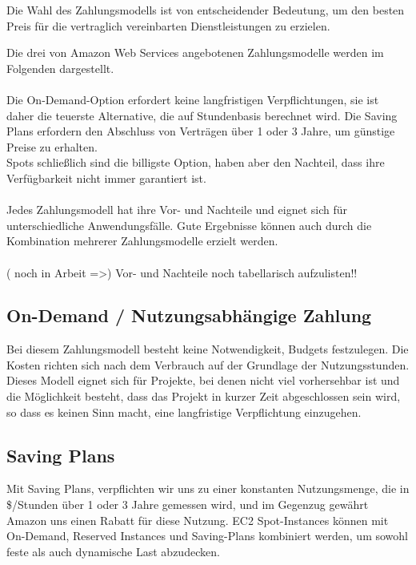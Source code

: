 Die Wahl des Zahlungsmodells ist von entscheidender Bedeutung, um den besten Preis für die vertraglich vereinbarten Dienstleistungen zu erzielen. 

Die drei von Amazon Web Services angebotenen Zahlungsmodelle werden im Folgenden dargestellt.
\\\\
Die On-Demand-Option erfordert keine langfristigen Verpflichtungen, sie ist daher die teuerste Alternative, die auf Stundenbasis berechnet wird. Die Saving Plans erfordern den Abschluss von Verträgen über 1 oder 3 Jahre, um günstige Preise zu erhalten.
\\Spots schließlich sind die billigste Option, haben aber den Nachteil, dass ihre Verfügbarkeit nicht immer garantiert ist.
\\\\
Jedes Zahlungsmodell hat ihre Vor- und Nachteile und eignet sich für unterschiedliche Anwendungsfälle. Gute Ergebnisse können auch durch die Kombination mehrerer Zahlungsmodelle erzielt werden.  
\\\\
( noch in Arbeit =>)
Vor- und Nachteile noch tabellarisch aufzulisten!!


\subsection{On-Demand / Nutzungsabhängige Zahlung}
Bei diesem Zahlungsmodell besteht keine Notwendigkeit, Budgets festzulegen. Die Kosten richten sich nach dem Verbrauch auf der Grundlage der Nutzungsstunden.
\\
Dieses Modell eignet sich für Projekte, bei denen nicht viel vorhersehbar ist und die Möglichkeit besteht, dass das Projekt in kurzer Zeit abgeschlossen sein wird, so dass es keinen Sinn macht, eine langfristige Verpflichtung einzugehen.
\\
\subsection{Saving Plans}
Mit Saving Plans, verpflichten wir uns zu einer konstanten Nutzungsmenge, die in \$/Stunden über 1 oder 3 Jahre gemessen wird, und im Gegenzug gewährt Amazon uns einen Rabatt für diese Nutzung.
EC2 Spot-Instances können mit On-Demand, Reserved Instances und Saving-Plans kombiniert werden, um sowohl feste als auch dynamische Last abzudecken.

